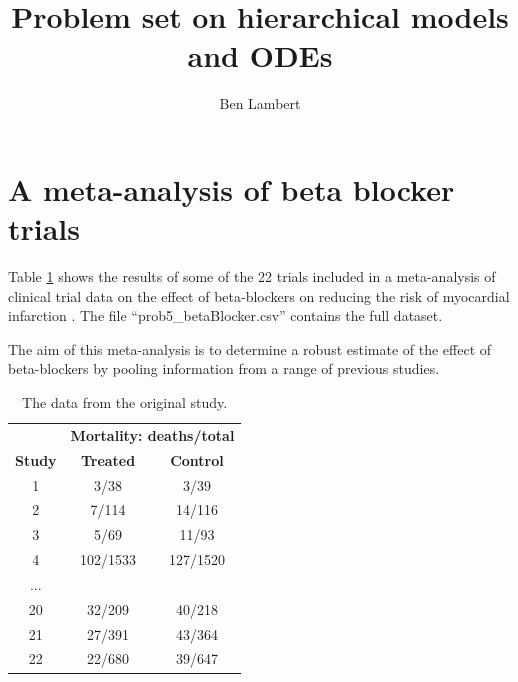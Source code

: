 \documentclass{article}
\title{Problem set on hierarchical models and ODEs}
\date{}
\author{Ben Lambert}
\begin{document}
\maketitle

\section{A meta-analysis of beta blocker trials}
Table \ref{tab:observedData} shows the results of some of the 22 trials included in a meta-analysis of clinical trial data on the effect of beta-blockers on reducing the risk of myocardial infarction \citep{carlin1992meta}. The file ``prob5\_betaBlocker.csv'' contains the full dataset.

The aim of this meta-analysis is to determine a robust estimate of the effect of beta-blockers by pooling information from a range of previous studies.

\begin{table}[htbp]
	\centering
	\caption{The data from the original study.}
	\begin{tabular}{ccc}
		& \multicolumn{2}{c}{\textbf{Mortality: deaths/total}} \\
		\textbf{Study} & \textbf{Treated} & \textbf{Control} \\
		1     & 3/38  & 3/39 \\
		2     & 7/114 & 14/116 \\
		3     & 5/69  & 11/93 \\
		4     & 102/1533 & 127/1520 \\
		...    &       &  \\
		20    & 32/209 & 40/218 \\
		21    & 27/391 & 43/364 \\
		22    & 22/680 & 39/647 \\
	\end{tabular}%
	\label{tab:observedData}%
\end{table}%
\end{document}
